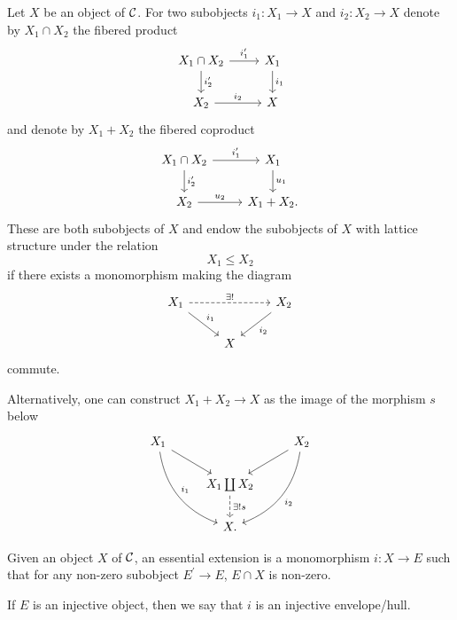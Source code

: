 \documentclass[dissertation.tex]{subfiles}
\begin{document}
\begin{defn}
  Let $X$ be an object of $\mathcal{C}$.
  For two subobjects $i_1 \colon X_1 \rightarrow X$ and $i_2 \colon X_2 \rightarrow X$ denote by $X_1 \cap X_2$ the fibered product
  $$\begin{tikzcd}
    X_1 \cap X_2 \arrow{d}{i_2^\prime}\arrow{r}{i_1^\prime} & X_1\arrow{d}{i_1}\\
    X_2 \arrow{r}{i_2} & X
  \end{tikzcd}$$
  and denote by $X_1 + X_2$ the fibered coproduct 
  $$\begin{tikzcd}
    X_1 \cap X_2 \arrow{r}{i_1^\prime} \arrow{d}{i_2^\prime} & X_1\arrow{d}{u_1}\\
    X_2 \arrow{r}{u_2} & X_1 + X_2.
  \end{tikzcd}$$
  These are both subobjects of $X$ and endow the subobjects of $X$ with lattice structure under the relation
  $$X_1 \leq X_2$$
  if there exists a monomorphism making the diagram
  $$\begin{tikzcd}
    X_1\arrow{rd}{i_1}\arrow[dashed]{rr}{\exists !} & & X_2 \arrow{ld}{i_2}\\
    & X &
  \end{tikzcd}$$
  commute.
\end{defn}

\begin{rmk}
  Alternatively, one can construct $X_1 + X_2 \rightarrow X$ as the image of the morphism $s$ below
  $$\begin{tikzcd}
    X_1\arrow[bend right]{rdd}{i_1}\arrow{rd} & & X_2 \arrow{ld} \arrow[bend left]{ldd}{i_2}\\
    & X_1 \coprod X_2\arrow[dashed]{d}{\exists !s} &\\
    & X. &
  \end{tikzcd}$$
\end{rmk}

\begin{defn}
  Given an object $X$ of $\mathcal{C}$, an essential extension is a monomorphism $i \colon X \rightarrow E$ such that for any non-zero subobject $E^\prime \rightarrow E$, $E \cap X$ is non-zero.
  
  If $E$ is an injective object, then we say that $i$ is an injective envelope/hull.
\end{defn}
\end{document}
